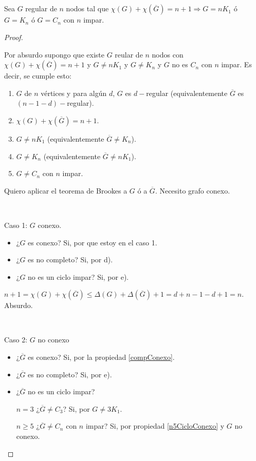 \setcounter{subsection}{12}
\subsection{}
\begin{lema}
Sea $G$ regular de $n$ nodos tal que $\chi(G) + \chi(\overline{G}) = n + 1 \Longrightarrow G = n K_1$ ó $G = K_n$ ó $G = C_n$ con $n$ impar.
\end{lema}

\begin{proof}
	
	~

	Por absurdo supongo que existe $G$ reular de $n$ nodos con $\chi(G) + \chi(\overline{G}) = n + 1$ y $G \not= n K_1$ y $G \not= K_n$ y $G$ no es $C_n$ con $n$ impar. Es decir, se cumple esto:

	\begin{enumerate}[label=\alph*)]
		\item $G$ de $n$ vértices y para algún $d$, $G$ es $d-$regular (equivalentemente $\overline{G}$ es $(n - 1 - d)-$regular).
		\item $\chi(G) + \chi(\overline{G}) = n + 1$.
		\item $G \not= n K_1$ (equivalentemente $\overline{G} \not= K_n$).
		\item $G \not= K_n$ (equivalentemente $\overline{G} \not= n K_1$).
		\item $G \not= C_n$ con $n$ impar.
	\end{enumerate}

	Quiero aplicar el teorema de Brookes a $G$ ó a $\overline{G}$. Necesito grafo conexo.

	~

	Caso 1: $G$ conexo.

	\begin{itemize}
		\item ¿$G$ es conexo? Si, por que estoy en el caso 1.
		\item ¿$G$ es no completo? Si, por d).
		\item ¿$G$ no es un ciclo impar? Si, por e).
	\end{itemize}

	$n + 1 = \chi(G) + \chi(\overline{G}) \leq \Delta(G) + \Delta(\overline{G}) + 1 = d + n - 1 - d + 1 = n$. Absurdo.

	~

	Caso 2: $G$ no conexo

	\begin{itemize}
		\item ¿$\overline{G}$ es conexo? Si, por la propiedad \ref{compConexo}.
		\item ¿$\overline{G}$ es no completo? Si, por e).
		\item {
			¿$\overline{G}$ no es un ciclo impar?

			$n = 3$ ¿$\overline{G} \not= C_3$? Si, por $G \not= 3 K_1$.

			$n \geq 5$ ¿$\overline{G} \not= C_n$ con $n$ impar? Si, por propiedad \ref{n5CicloConexo} y $G$ no conexo.
		}
	\end{itemize}
\end{proof}